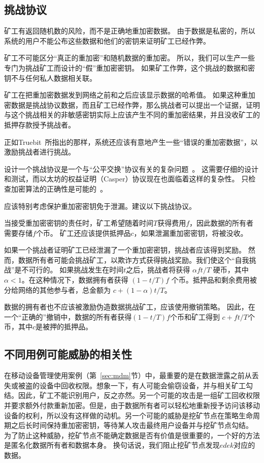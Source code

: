 \documentclass[longbibliography,nofootinbib]{revtex4-1}
\begin{document}
\begin{CJK*}{UTF8}{gbsn}
\subsection{挑战协议}
\label{sec:challenge-protocol}

矿工有返回随机数的风险，而不是正确地重加密数据。 由于数据是私密的，所以系统的用户不能公布这些数据和他们的密钥来证明矿工已经作弊。

    矿工不可能区分“真正的重加密”和随机数据的重加密。 所以，我们可以生产一些专门为挑战矿工而设计的“假”重加密密钥。 如果矿工作弊，这个挑战的数据和密钥不与任何私人数据相关联。
    
    矿工在把重加密数据发到网络之前和之后应该显示数据的哈希值。 如果这种重加密数据是挑战协议数据，而且矿工已经作弊，那么挑战者可以提出一个证据，证明与这个挑战相关的非敏感密钥实际上应该产生不同的重加密结果，并且没收矿工的抵押存款授予挑战者。
    
    正如Truebit~\cite{truebit}所指出的那样，系统还应该有意地产生一些“错误的重加密数据”，以激励挑战者进行挑战。

	设计一个挑战协议是一个与“公平交换”协议有关的复杂问题~\cite{BitcoinMPC2016,Bentov2014,AccountableStorage}。 这需要仔细的设计和测试，而以太坊的权益证明（Casper）协议现在也面临着这样的复杂性。 只检查加密算法的正确性是可能的~\cite{Zhou2002}。
    
    应该特别考虑保护重加密密钥免于泄漏。建议以下挑战协议。
    
    当接受重加密密钥的责任时，矿工希望随着时间$T$获得费用$f$，因此数据的所有者需要存储$f$个币。 矿工还应该提供抵押品$c$，如果泄漏重加密密钥，将被没收。

	如果一个挑战者证明矿工已经泄漏了一个重加密密钥，挑战者应该得到奖励。 然而，数据所有者可能会挑战矿工，以欺诈方式获得挑战奖励。我们使这个“自我挑战”是不可行的。 如果挑战发生在时间$t$之后，挑战者将获得 $\alpha f t/T$ 硬币，其中$\alpha < 1$。在这种情况下，数据拥有者获得  $(1 - t/T) f$  个币。抵押品和剩余费用被分给网络的其他参与者，总金额为 $c + (1 - \alpha) t/T$。

    数据的拥有者也不应该被激励伪造数据挑战矿工，应该使用撤销策略。 因此，在一个“正确的”撤销中，数据的所有者获得$(1 - t/T) f$个币和矿工得到 $c + ft/T$个币，其中$c$是被押的抵押品。

\subsection{不同用例可能威胁的相关性}


    在移动设备管理使用案例（第~\ref{sec:mdm}节）中，最重要的是在数据泄露之前从丢失或被盗的设备中回收权限。想象一下，有人可能会偷窃设备，并与相关矿工勾结。因此，矿工不能识别用户，反之亦然。另一个可能的攻击是一组矿工回收权限并要求额外付款重新加密。但是，由于数据所有者可以轻松地重新授予访问该移动设备的权利，所以没有这样做的动机。另一个可能的威胁是挖矿节点在策略生命周期之后长时间保持重加密密钥，等待某人攻击最终用户设备并与挖矿节点勾结。 为了防止这种威胁，挖矿节点不能确定数据是否有价值是很重要的，一个好的方法是匿名化数据所有者和数据本身。 换句话说，我们阻止挖矿节点发现$edek$对应的数据。
    

\end{CJK*}
\end{document}
